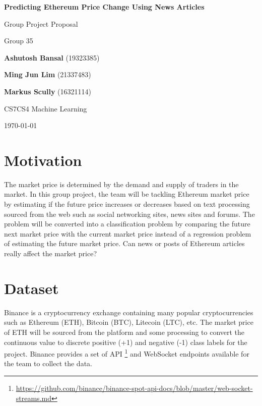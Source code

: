 \documentclass{article}
\begin{document}
\begin{titlepage}
	\begin{center}
		\vspace*{3cm}

		\textbf{ Predicting Ethereum Price Change Using News Articles }
       
		\vspace{0.5cm}
		Group Project Proposal
		
		Group 35   
                      

		\vfill
            
		\textbf{Ashutosh Bansal} (19323385)
       
		\textbf{Ming Jun Lim} (21337483)
		
		\textbf{Markus Scully} (16321114)		
       

		\vspace{0.5cm}
		CS7CS4 Machine Learning     
       
			 
		\today           
       
		\vspace{1.5cm}                            
	\end{center}
\end{titlepage}


\section{Motivation}

The market price is determined by the demand and supply of traders in the market. In this group project, the team will be tackling Ethereum market price by estimating if the future price increases or decreases based on text processing sourced from the web such as social networking sites, news sites and forums. The problem will be converted into a classification problem by comparing the future next market price with the current market price instead of a regression problem of estimating the future market price. Can news or posts of Ethereum articles really affect the market price?

\section{Dataset}

Binance is a cryptocurrency exchange containing many popular cryptocurrencies such as Ethereum (ETH), Bitcoin (BTC), Litecoin (LTC), etc. The market price of ETH will be sourced from the platform and some processing to convert the continuous value to discrete positive (+1) and negative (-1) class labels for the project. Binance provides a set of API \footnote{\url{https://github.com/binance/binance-spot-api-docs/blob/master/web-socket-streams.md}} and WebSocket endpoints available for the team to collect the data. 
\end{document}
